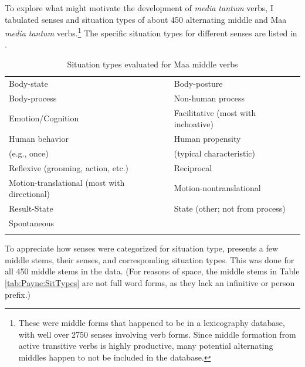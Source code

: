 \documentclass[output=paper,colorlinks,citecolor=brown
]{langscibook}
\begin{document}
To explore what might motivate the development of \textit{media tantum} verbs, I tabulated senses and situation types of about 450 alternating middle and Maa \textit{media tantum} verbs.\footnote{These were middle forms that happened to be in a lexicography database, with well over 2750 senses involving verb forms. Since middle formation from active transitive verbs is highly productive, many potential alternating middles happen to not be included in the database.} The specific situation types for different senses are listed in . 

\begin{table}
\caption{Situation types evaluated for Maa middle verbs}
\label{tab:Payne:SitType1}
\begin{tabular}{ll}
\lsptoprule
Body-state & Body-posture  \\
Body-process & Non-human process \\
Emotion/Cognition & Facilitative (most with inchoative) \\
Human behavior  &Human propensity \\
 (e.g., once) &(typical characteristic)\\
Reflexive (grooming, action, etc.) & Reciprocal\\
Motion-translational  (most with directional)& Motion-nontranslational\\
Result-State  & State (other; not from process)  \\
Spontaneous  \\
\lspbottomrule
\end{tabular}
\end{table}

To appreciate how senses were categorized for situation type,  presents a few middle stems, their senses, and corresponding situation types. This was done for all 450 middle stems in the data. (For reasons of space, the middle stems in Table \ref{tab:Payne:SitTypes} are not full word forms, as they lack an infinitive or person prefix.)
\end{document}
